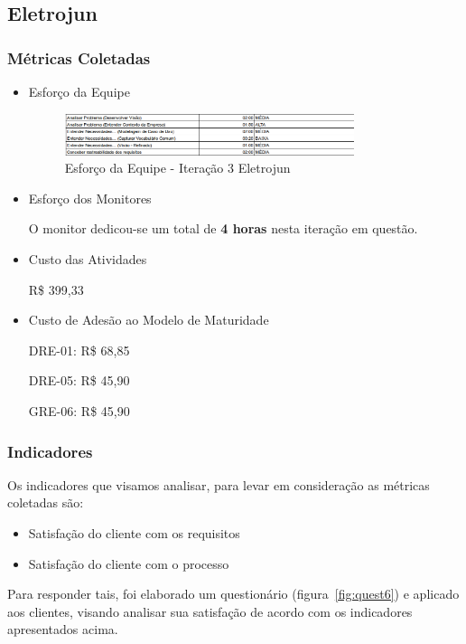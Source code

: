 \subsection{Eletrojun}

\subsubsection{Métricas Coletadas}

\begin{itemize}
\item Esforço da Equipe

\begin{figure}[H]
    \center
    \includegraphics[width=0.8\textwidth]{figuras/esforco-eqp6}
    \caption{Esforço da Equipe - Iteração 3 Eletrojun}
    \label{fig:esforco-eqp6}
\end{figure}

\item Esforço dos Monitores

O monitor dedicou-se um total de \textbf{4 horas} nesta iteração em questão.

\item Custo das Atividades

R\$ 399,33

\item Custo de Adesão ao Modelo de Maturidade

DRE-01: R\$ 68,85

DRE-05: R\$ 45,90

GRE-06: R\$ 45,90

\end{itemize}

\subsubsection{Indicadores}

Os indicadores que visamos analisar, para levar em consideração as métricas coletadas são:
\begin{itemize}
\item Satisfação do cliente com os requisitos
\item Satisfação do cliente com o processo
\end{itemize}

Para responder tais, foi elaborado um questionário (figura~\ref{fig:quest6}) e aplicado aos clientes, visando analisar sua satisfação de acordo com os indicadores apresentados acima.

